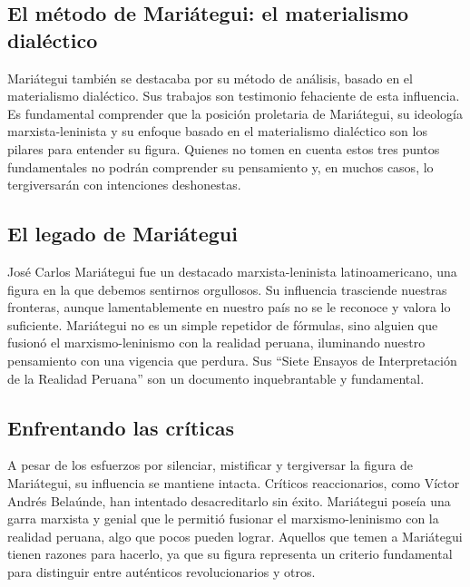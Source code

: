 \documentclass[
  letterpaper,
  DIV=11,
  numbers=noendperiod]{scrartcl}
\begin{document}
\hypertarget{el-muxe9todo-de-mariuxe1tegui-el-materialismo-dialuxe9ctico}{%
\subsection{El método de Mariátegui: el materialismo
dialéctico}\label{el-muxe9todo-de-mariuxe1tegui-el-materialismo-dialuxe9ctico}}

Mariátegui también se destacaba por su método de análisis, basado en el
materialismo dialéctico. Sus trabajos son testimonio fehaciente de esta
influencia. Es fundamental comprender que la posición proletaria de
Mariátegui, su ideología marxista-leninista y su enfoque basado en el
materialismo dialéctico son los pilares para entender su figura. Quienes
no tomen en cuenta estos tres puntos fundamentales no podrán comprender
su pensamiento y, en muchos casos, lo tergiversarán con intenciones
deshonestas.

\hypertarget{el-legado-de-mariuxe1tegui}{%
\subsection{El legado de Mariátegui}\label{el-legado-de-mariuxe1tegui}}

José Carlos Mariátegui fue un destacado marxista-leninista
latinoamericano, una figura en la que debemos sentirnos orgullosos. Su
influencia trasciende nuestras fronteras, aunque lamentablemente en
nuestro país no se le reconoce y valora lo suficiente. Mariátegui no es
un simple repetidor de fórmulas, sino alguien que fusionó el
marxismo-leninismo con la realidad peruana, iluminando nuestro
pensamiento con una vigencia que perdura. Sus ``Siete Ensayos de
Interpretación de la Realidad Peruana'' son un documento inquebrantable
y fundamental.

\hypertarget{enfrentando-las-cruxedticas}{%
\subsection{Enfrentando las
críticas}\label{enfrentando-las-cruxedticas}}

A pesar de los esfuerzos por silenciar, mistificar y tergiversar la
figura de Mariátegui, su influencia se mantiene intacta. Críticos
reaccionarios, como Víctor Andrés Belaúnde, han intentado desacreditarlo
sin éxito. Mariátegui poseía una garra marxista y genial que le permitió
fusionar el marxismo-leninismo con la realidad peruana, algo que pocos
pueden lograr. Aquellos que temen a Mariátegui tienen razones para
hacerlo, ya que su figura representa un criterio fundamental para
distinguir entre auténticos revolucionarios y otros.
\end{document}
